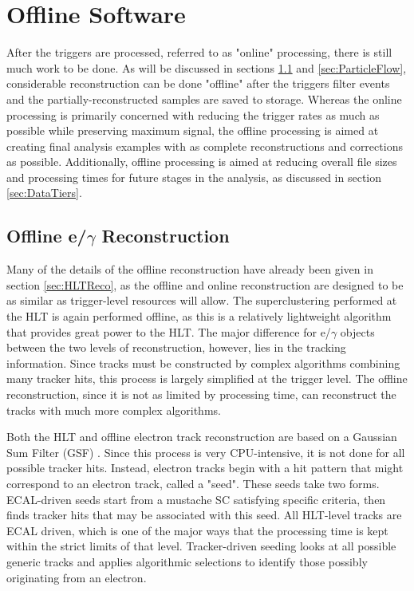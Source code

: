 \documentclass[12pt]{ucsddissertation}
\begin{document}
\section{Offline Software} \label{sec:AnalysisSoftware}
After the triggers are processed, referred to as "online" processing, there is still much work to be done. As will be discussed in sections \ref{sec:OfflineReco} and \ref{sec:ParticleFlow}, considerable reconstruction can be done "offline" after the triggers filter events and the partially-reconstructed samples are saved to storage. Whereas the online processing is primarily concerned with reducing the trigger rates as much as possible while preserving maximum signal, the offline processing is aimed at creating final analysis examples with as complete reconstructions and corrections as possible. Additionally, offline processing is aimed at reducing overall file sizes and processing times for future stages in the analysis, as discussed in section \ref{sec:DataTiers}.

\subsection{Offline e/$\gamma$ Reconstruction} \label{sec:OfflineReco}
Many of the details of the offline reconstruction have already been given in section \ref{sec:HLTReco}, as the offline and online reconstruction are designed to be as similar as trigger-level resources will allow. The superclustering performed at the HLT is again performed offline, as this is a relatively lightweight algorithm that provides great power to the HLT. The major difference for e/$\gamma$ objects between the two levels of reconstruction, however, lies in the tracking information. Since tracks must be constructed by complex algorithms combining many tracker hits, this process is largely simplified at the trigger level. The offline reconstruction, since it is not as limited by processing time, can reconstruct the tracks with much more complex algorithms.

Both the HLT and offline electron track reconstruction are based on a Gaussian Sum Filter (GSF) \cite{GSFTracking}. Since this process is very CPU-intensive, it is not done for all possible tracker hits. Instead, electron tracks begin with a hit pattern that might correspond to an electron track, called a "seed". These seeds take two forms. ECAL-driven seeds start from a mustache SC satisfying specific criteria, then finds tracker hits that may be associated with this seed. All HLT-level tracks are ECAL driven, which is one of the major ways that the processing time is kept within the strict limits of that level. Tracker-driven seeding looks at all possible generic tracks and applies algorithmic selections to identify those possibly originating from an electron.
\end{document}

